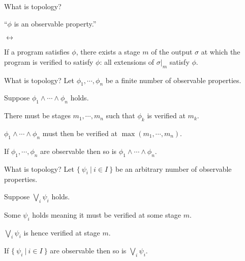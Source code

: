 \documentclass[xcolor={dvipsnames}]{beamer}
\begin{document}
\begin{frame}{What is topology?}
  \large
  \begin{center}
    ``$\phi$ is an \alert{observable property}.''

    \vspace{0.5em}
    $\leftrightarrow$
    \vspace{0.5em}

    If a program satisfies $\phi$, there exists a stage $m$ of the output $\sigma$ at which the
    program is \alert{verified} to satisfy $\phi$: all extensions of $\sigma|_m$ satisfy $\phi$.
  \end{center}
\end{frame}

\begin{frame}{What is topology?}
  Let $\phi_1, \cdots ,\phi_n$ be a \alert{finite} number of observable properties.

  \vspace{1em}

  Suppose $\phi_1 \wedge \cdots \wedge \phi_n$ holds.

  \vspace{1em}

  There must be \alert{stages} $m_1, \cdots , m_n$ such that $\phi_k$ is verified at $m_k$.

  \vspace{1em}

  $\phi_1 \wedge \cdots \wedge \phi_n$ must then be verified at $\max(m_1, \cdots, m_n)$.

  \vspace{1em}

  If $\phi_1, \cdots, \phi_n$ are \alert{observable} then so is $\phi_1 \wedge \cdots \wedge \phi_n$.
\end{frame}

\begin{frame}{What is topology?}
    Let $\{~\psi_i ~|~ i \in I~\}$ be an \alert{arbitrary} number of observable properties.

    \vspace{1em}

    Suppose $\bigvee_i \psi_i$ holds.

    \vspace{1em}

    Some $\psi_i$ holds meaning it must be verified at some \alert{stage} $m$.

    \vspace{1em}

    $\bigvee_i \psi_i$ is hence verified at \alert{stage} $m$.

    \vspace{1em}

    If $\{~\psi_i ~|~ i \in I~\}$ are \alert{observable} then so is $\bigvee_i \psi_i$.
\end{frame}
\end{document}
